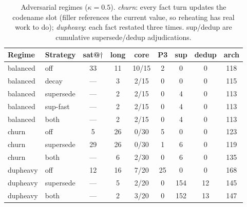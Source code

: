 \documentclass[10pt]{article}
\begin{document}
\begin{table}[t]
\centering\small
\begin{tabular}{llccccccc}
\hline
Regime & Strategy & sat@$\dagger$ & long & core & P3 & sup & dedup & arch\\
\hline
balanced & off       & 33 & 11 & 10/15 & 2 &  0  &  0 & 118\\
balanced & decay     & --- &  3 &  2/15 & 0 &  0  &  0 & 115\\
balanced & supersede & --- &  2 &  2/15 & 0 &  4 &  0 & 113\\
balanced & sup-fast  & --- &  2 &  2/15 & 0 &  4 &  0 & 113\\
balanced & both      & --- &  2 &  2/15 & 0 &  4 &  0 & 113\\
churn    & off       &  5 & 26 &  0/30 & 5 &  0  &  0 & 123\\
churn    & supersede & 29 & 26 &  0/30 & 1 &  6 &  0 & 119\\
churn    & both      & --- &  6 &  2/30 & 0 &  6 &  0 & 135\\
dupheavy & off       & 12 & 16 &  7/20 & 25 &  0   &  0 & 168\\
dupheavy & supersede & --- &  5 &  2/20 & 0 & 154 & 12 & 145\\
dupheavy & both      & --- &  2 &  3/20 & 0 & 152 & 13 & 147\\
\hline
\end{tabular}
\caption{Adversarial regimes ($\kappa=0.5$). \emph{churn}: every fact turn updates the codename slot (filler references the current value, so reheating has real work to do); \emph{dupheavy}: each fact restated three times. sup/dedup are cumulative supersede/dedup adjudications.}
\label{tab:forget_adv}
\end{table}
\end{document}
